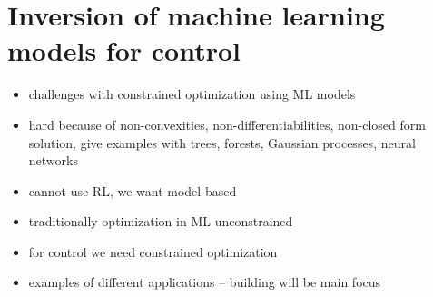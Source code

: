 \section{Inversion of machine learning models for control}

\begin{itemize}
	\item challenges with constrained optimization using ML models
	\item hard because of non-convexities, non-differentiabilities, non-closed form solution, give examples with trees, forests, Gaussian processes, neural networks
	\item cannot use RL, we want model-based
	\item traditionally optimization in ML unconstrained
	\item for control we need constrained optimization
	\item examples of different applications – building will be main focus
\end{itemize}
